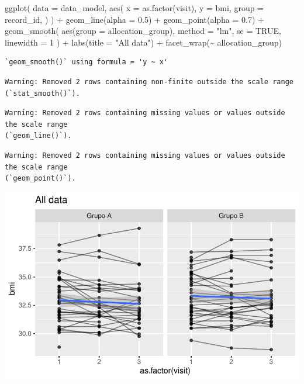 \documentclass[
  letterpaper,
  DIV=11,
  numbers=noendperiod]{scrartcl}
\newenvironment{Shaded}{\begin{snugshade}}{\end{snugshade}}
\newcommand{\AttributeTok}[1]{\textcolor[rgb]{0.40,0.45,0.13}{#1}}
\newcommand{\ConstantTok}[1]{\textcolor[rgb]{0.56,0.35,0.01}{#1}}
\newcommand{\DecValTok}[1]{\textcolor[rgb]{0.68,0.00,0.00}{#1}}
\newcommand{\FloatTok}[1]{\textcolor[rgb]{0.68,0.00,0.00}{#1}}
\newcommand{\FunctionTok}[1]{\textcolor[rgb]{0.28,0.35,0.67}{#1}}
\newcommand{\NormalTok}[1]{\textcolor[rgb]{0.00,0.23,0.31}{#1}}
\newcommand{\SpecialCharTok}[1]{\textcolor[rgb]{0.37,0.37,0.37}{#1}}
\newcommand{\StringTok}[1]{\textcolor[rgb]{0.13,0.47,0.30}{#1}}
\begin{document}
\begin{Shaded}
\begin{Highlighting}[]
\FunctionTok{ggplot}\NormalTok{(}
    \AttributeTok{data =}\NormalTok{ data\_model, }
    \FunctionTok{aes}\NormalTok{(}
        \AttributeTok{x =} \FunctionTok{as.factor}\NormalTok{(visit),}
        \AttributeTok{y =}\NormalTok{ bmi,}
        \AttributeTok{group =}\NormalTok{ record\_id,}
\NormalTok{    )}
\NormalTok{) }\SpecialCharTok{+}
    \FunctionTok{geom\_line}\NormalTok{(}\AttributeTok{alpha =} \FloatTok{0.5}\NormalTok{) }\SpecialCharTok{+}
    \FunctionTok{geom\_point}\NormalTok{(}\AttributeTok{alpha =} \FloatTok{0.7}\NormalTok{) }\SpecialCharTok{+}
    \FunctionTok{geom\_smooth}\NormalTok{(}
        \FunctionTok{aes}\NormalTok{(}\AttributeTok{group =}\NormalTok{ allocation\_group),}
        \AttributeTok{method =} \StringTok{"lm"}\NormalTok{,}
        \AttributeTok{se =} \ConstantTok{TRUE}\NormalTok{,}
        \AttributeTok{linewidth =} \DecValTok{1}
\NormalTok{    ) }\SpecialCharTok{+}
    \FunctionTok{labs}\NormalTok{(}\AttributeTok{title =} \StringTok{"All data"}\NormalTok{) }\SpecialCharTok{+}
    \FunctionTok{facet\_wrap}\NormalTok{(}\SpecialCharTok{\textasciitilde{}}\NormalTok{ allocation\_group) }
\end{Highlighting}
\end{Shaded}

\begin{verbatim}
`geom_smooth()` using formula = 'y ~ x'
\end{verbatim}

\begin{verbatim}
Warning: Removed 2 rows containing non-finite outside the scale range
(`stat_smooth()`).
\end{verbatim}

\begin{verbatim}
Warning: Removed 2 rows containing missing values or values outside the scale range
(`geom_line()`).
\end{verbatim}

\begin{verbatim}
Warning: Removed 2 rows containing missing values or values outside the scale range
(`geom_point()`).
\end{verbatim}

\includegraphics{Outcomes_V1V2V3_files/figure-pdf/bmi_6-1.pdf}
\end{document}
